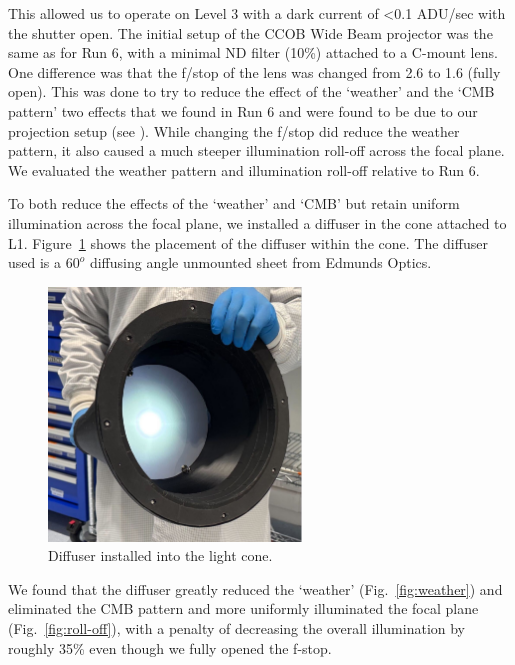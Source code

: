 This allowed us to operate on Level 3 with a dark current of
\textless0.1 ADU/sec with the shutter open. The initial setup of the
CCOB Wide Beam projector was the same as for Run 6, with a minimal ND filter (10\%)
attached to a C-mount lens. One difference was that the f/stop of the lens
was changed from 2.6 to 1.6 (fully open). This was done to try to
reduce the effect of the `weather' and
the `CMB pattern' two effects that we
found in Run 6 and were found to be due to our projection setup (see
\citet{2024arXiv241113386B}). While changing  the f/stop  did
reduce the weather pattern, it also caused a much steeper illumination roll-off
across the focal plane. We evaluated the weather pattern and illumination roll-off relative to Run 6.


To both reduce the effects of the
`weather' and
`CMB' but retain uniform illumination
across the focal plane, we installed a diffuser in the cone attached to
L1. Figure~\ref{fig:diffuser} shows the placement of the diffuser within the cone.  The diffuser used is a $60^o$ diffusing angle unmounted sheet from Edmunds Optics.

\begin{figure}
\centering
\includegraphics[width=0.6\textwidth]{figures/Diffuser.jpg}
\caption{Diffuser installed into the light cone.}
\label{fig:diffuser}
\end{figure}

We found that the diffuser greatly reduced the `weather' (Fig.~\ref{fig:weather}) and eliminated the CMB pattern and more uniformly illuminated the focal plane (Fig.~\ref{fig:roll-off}), with a penalty of decreasing the overall illumination by roughly 35\% even though we fully opened the f-stop.


